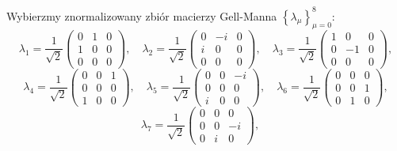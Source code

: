 {Wybierzmy znormalizowany zbiór macierzy Gell-Manna
$\left \{ \lambda_{\mu} \right \}_{\mu=0}^{8}$:
\begin{equation}
\nonumber
    \lambda_{1} = \frac{1}{\sqrt{2}} \begin{pmatrix}
            0 & 1 & 0 \\
            1 & 0 & 0 \\
            0 & 0 & 0
        \end{pmatrix}, \quad
    \lambda_{2} = \frac{1}{\sqrt{2}} \begin{pmatrix}
            0 & -i & 0 \\
            i & 0 & 0 \\
            0 & 0 & 0
        \end{pmatrix}, \quad
    \lambda_{3} = \frac{1}{\sqrt{2}} \begin{pmatrix}
            1 & 0 & 0 \\
            0 & -1 & 0 \\
            0 & 0 & 0
        \end{pmatrix},
\end{equation}
\begin{equation}
\nonumber
    \lambda_{4} = \frac{1}{\sqrt{2}} \begin{pmatrix}
            0 & 0 & 1 \\
            0 & 0 & 0 \\
            1 & 0 & 0
        \end{pmatrix}, \quad
    \lambda_{5} = \frac{1}{\sqrt{2}} \begin{pmatrix}
            0 & 0 & -i \\
            0 & 0 & 0 \\
            i & 0 & 0
        \end{pmatrix}, \quad
    \lambda_{6} = \frac{1}{\sqrt{2}} \begin{pmatrix}
            0 & 0 & 0 \\
            0 & 0 & 1 \\
            0 & 1 & 0
        \end{pmatrix},
\end{equation}
\begin{equation}
\nonumber
    \lambda_{7} = \frac{1}{\sqrt{2}} \begin{pmatrix}
            0 & 0 & 0 \\
            0 & 0 & -i \\
            0 & i & 0
        \end{pmatrix}, \quad

\end{equation}}
